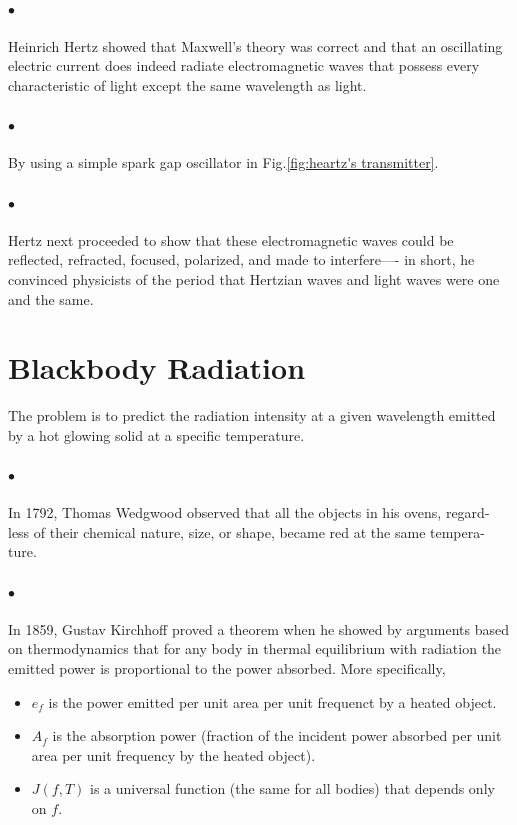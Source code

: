     \paragraph{$\bullet$} Heinrich Hertz showed that Maxwell’s theory was correct and that an oscillating electric 
    current does indeed radiate electromagnetic waves that possess every characteristic of light 
    except the same wavelength as light.  

    \paragraph{$\bullet$} By using a simple spark gap oscillator in Fig.\eqref{fig:heartz's transmitter}.

    \paragraph{$\bullet$} Hertz next proceeded to show that these electromagnetic waves could be reflected, 
    refracted, focused, polarized, and made to interfere—- in short, he convinced physicists 
    of the period that Hertzian waves and light waves were one and the same.
    
\section{Blackbody Radiation}
    The problem is to predict the radiation intensity at a given wavelength emitted by 
    a hot glowing solid at a specific temperature.
    \paragraph{$\bullet$} In 1792, Thomas Wedgwood observed that all the objects in his ovens, regard- less 
    of their chemical nature, size, or shape, became red at the same tempera- ture.
    \paragraph{$\bullet$} In 1859, Gustav Kirchhoff proved a theorem when he showed by arguments based 
    on thermodynamics that for any body in thermal equilibrium with radiation the emitted power is 
    proportional to the power absorbed. More specifically,
    {\tiny \begin{itemize}
        \item $e_f$ is the power emitted per unit area per unit frequenct by a heated object.
        \item $A_f$ is the absorption power (fraction of the incident power absorbed per 
        unit area per unit frequency by the heated object).
        \item $J(f, T)$ is a universal function (the same for all bodies) that depends only on $f$.
    \end{itemize}}

